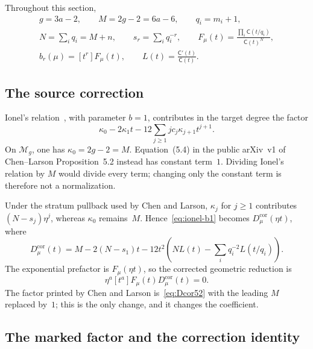 \documentclass[11pt]{article}
\theoremstyle{definition}
\theoremstyle{remark}
\newcommand{\C}{\mathsf C}
\begin{document}
Throughout this section,
\begin{equation}\label{eq:prop52-notation}
 \begin{gathered}
  g=3a-2,\qquad M=2g-2=6a-6,\qquad q_i=m_i+1,\\
  N=\sum_iq_i=M+n,\qquad s_r=\sum_iq_i^{-r},\qquad
  F_\mu(t)=\frac{\prod_i\C(t/q_i)}{\C(t)^N},\\
  b_r(\mu)=[t^r]F_\mu(t),\qquad L(t)=\frac{\C'(t)}{\C(t)}.
 \end{gathered}
\end{equation}

\subsection{The source correction}\label{subsec:correction}

Ionel's relation~\cite[Proposition~1.7, equation~(1.13)]{Ionel}, with parameter
$b=1$, contributes in the target degree the factor
\begin{equation}\label{eq:ionel-b1}
 \kappa_0-2\kappa_1t-12\sum_{j\ge1}jc_j\kappa_{j+1}t^{j+1}.
\end{equation}
On $\mathcal M_g$, one has $\kappa_0=2g-2=M$.  Equation~(5.4) in the public
arXiv~v1 of Chen--Larson Proposition~5.2 instead has constant term~$1$.
Dividing Ionel's relation by $M$ would divide every term; changing only the
constant term is therefore not a normalization.

Under the stratum pullback used by Chen and Larson,
$\kappa_j$ for $j\ge1$ contributes $(N-s_j)\eta^j$, whereas
$\kappa_0$ remains~$M$.  Hence~\eqref{eq:ionel-b1} becomes
$D_\mu^{\mathrm{cor}}(\eta t)$, where
\begin{equation}\label{eq:Dcor52}
 D_\mu^{\mathrm{cor}}(t)
 =M-2(N-s_1)t-12t^2\left(NL(t)-\sum_iq_i^{-2}L(t/q_i)\right).
\end{equation}
The exponential prefactor is $F_\mu(\eta t)$, so the corrected geometric
reduction is
\begin{equation}\label{eq:corrected52}
  \eta^a[t^a]F_\mu(t)D_\mu^{\mathrm{cor}}(t)=0.
\end{equation}
The factor printed by Chen and Larson is~\eqref{eq:Dcor52} with the leading
$M$ replaced by~$1$; this is the only change, and it changes the coefficient.

\subsection{The marked factor and the correction identity}\label{subsec:identity52}
\end{document}
